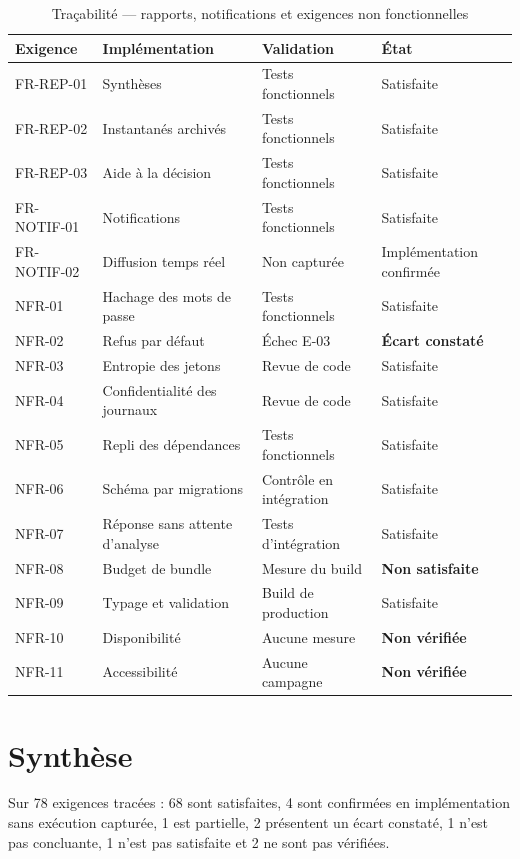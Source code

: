 \begin{table}[htbp]
  \centering
  \caption{Traçabilité — rapports, notifications et exigences non fonctionnelles}
  \begin{tabularx}{\textwidth}{L{2.3cm} L{3.4cm} L{3.0cm} X}
    \toprule
    \textbf{Exigence} & \textbf{Implémentation} & \textbf{Validation} & \textbf{État} \\
    \midrule
    FR-REP-01   & Synthèses & Tests fonctionnels & Satisfaite \\
    FR-REP-02   & Instantanés archivés & Tests fonctionnels & Satisfaite \\
    FR-REP-03   & Aide à la décision & Tests fonctionnels & Satisfaite \\
    FR-NOTIF-01 & Notifications & Tests fonctionnels & Satisfaite \\
    FR-NOTIF-02 & Diffusion temps réel & Non capturée & Implémentation confirmée \\
    NFR-01 & Hachage des mots de passe & Tests fonctionnels & Satisfaite \\
    NFR-02 & Refus par défaut & Échec E-03 & \textbf{Écart constaté} \\
    NFR-03 & Entropie des jetons & Revue de code & Satisfaite \\
    NFR-04 & Confidentialité des journaux & Revue de code & Satisfaite \\
    NFR-05 & Repli des dépendances & Tests fonctionnels & Satisfaite \\
    NFR-06 & Schéma par migrations & Contrôle en intégration & Satisfaite \\
    NFR-07 & Réponse sans attente d'analyse & Tests d'intégration & Satisfaite \\
    NFR-08 & Budget de bundle & Mesure du build & \textbf{Non satisfaite} \\
    NFR-09 & Typage et validation & Build de production & Satisfaite \\
    NFR-10 & Disponibilité & Aucune mesure & \textbf{Non vérifiée} \\
    NFR-11 & Accessibilité & Aucune campagne & \textbf{Non vérifiée} \\
    \bottomrule
  \end{tabularx}
\end{table}

\section{Synthèse}

Sur 78 exigences tracées : 68 sont satisfaites, 4 sont confirmées en
implémentation sans exécution capturée, 1 est partielle, 2 présentent un écart
constaté, 1 n'est pas concluante, 1 n'est pas satisfaite et 2 ne sont pas
vérifiées.
